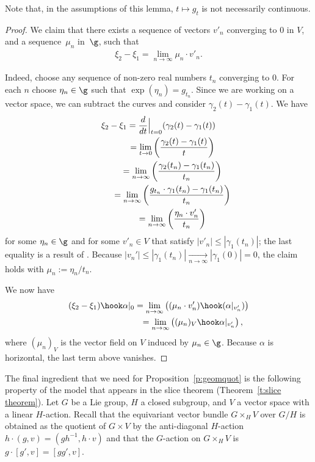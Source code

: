 Note that, in the assumptions of this lemma,
$t \mapsto g_t$ is not necessarily continuous.

\begin{proof}
We claim that there exists a sequence of vectors $v'_n$
converging to $0$ in $V$, and a sequence~$\mu_n$ in~$\g$, such that
\begin{gather*} \xi_2 - \xi_1 = \underset{n\to\infty}{\lim} \mu_n\cdot v'_n. \end{gather*}

Indeed,
choose any sequence of non-zero real numbers $t_n$ converging to $0$.
For
each $n$ choose $\eta_n \in \g$ such that $\exp(\eta_n)=g_{t_n}$.
Since we are working on a vector space, we can subtract the curves
and consider $\gamma_2(t) - \gamma_1(t)$. We have
\begin{gather*}
 \xi_2 - \xi_1 = \frac{d}{dt} \Big|_{t=0} (\gamma_2(t)-\gamma_1(t))\\
  \hphantom{\xi_2 - \xi_1}{}
 = \underset{t \to 0} {\lim}
 \left( \frac{\gamma_2(t)-\gamma_1(t)}{t} \right)\\
 \hphantom{\xi_2 - \xi_1}{}
 = \underset{n\to\infty} {\lim}
 \left( \frac{\gamma_2(t_n)-\gamma_1(t_n)}{t_n} \right) \\
 \hphantom{\xi_2 - \xi_1}{}
 = \underset{n\to\infty}{\lim}
 \left( \frac{g_{t_n} \cdot \gamma_1(t_n) - \gamma_1(t_n)}{t_n} \right)\\
 \hphantom{\xi_2 - \xi_1}{}
 = \underset{n\to\infty}{\lim}
 \left( \frac{ \eta_n \cdot v'_n }{t_n} \right)
\end{gather*}
for some $\eta_n \in \g$ and
for some $v'_n \in V$ that satisfy $ |v'_n| \leq |\gamma_1(t_n)| $;
the last equality is a result of .
Because $|v_n'| \leq |\gamma_1(t_n)| \underset{n\to\infty}{\to} |\gamma_1(0)|
 = 0$,
the claim holds with $\mu_n := \eta_n/t_n$.

We now have
\begin{gather*}
 (\xi_2-\xi_1) \hook \alpha|_0 = \underset{n\to\infty}{\lim}
 \left( (\mu_n\cdot v'_n) \hook(\alpha|_{v'_n}) \right)\\
 \hphantom{(\xi_2-\xi_1) \hook \alpha|_0}{}
 = \underset{n\to\infty}{\lim}
 \left( (\mu_n)_V\hook\alpha|_{v'_n} \right),
\end{gather*}
where $(\mu_n)_V$ is the vector f\/ield on $V$ induced by $\mu_n\in\g$.
Because $\alpha$ is horizontal, the last term above vanishes.
\end{proof}

The f\/inal ingredient that we need for Proposition~\ref{p:geomquot} is
the following property of the model that appears in the slice theorem
(Theorem~\ref{t:slice theorem}).
Let $G$ be a Lie group, $H$ a closed subgroup, and $V$ a vector space
with a linear $H$-action. Recall that the equivariant vector bundle
$ G \times_H V $
over $G/H$ is obtained as the quotient of $G \times V$
by the anti-diagonal $H$-action $h \cdot (g,v) = (g h^{-1} , h \cdot v)$
and that the $G$-action on $G\times_H V$ is $g\cdot[g',v]=[gg',v]$.

